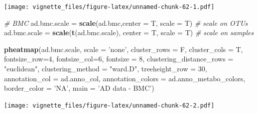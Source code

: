 \documentclass[]{book}
\newenvironment{Shaded}{\begin{snugshade}}{\end{snugshade}}
\newcommand{\KeywordTok}[1]{\textcolor[rgb]{0.13,0.29,0.53}{\textbf{#1}}}
\newcommand{\DataTypeTok}[1]{\textcolor[rgb]{0.13,0.29,0.53}{#1}}
\newcommand{\DecValTok}[1]{\textcolor[rgb]{0.00,0.00,0.81}{#1}}
\newcommand{\StringTok}[1]{\textcolor[rgb]{0.31,0.60,0.02}{#1}}
\newcommand{\CommentTok}[1]{\textcolor[rgb]{0.56,0.35,0.01}{\textit{#1}}}
\newcommand{\NormalTok}[1]{#1}
\begin{document}
\texttt{[image: vignette\_files/figure-latex/unnamed-chunk-62-1.pdf]}

\begin{Shaded}
\begin{Highlighting}[]
\CommentTok{# BMC}
\NormalTok{ad.bmc.scale =}\StringTok{ }\KeywordTok{scale}\NormalTok{(ad.bmc,}\DataTypeTok{center =}\NormalTok{ T, }\DataTypeTok{scale =}\NormalTok{ T) }\CommentTok{# scale on OTUs}
\NormalTok{ad.bmc.scale =}\StringTok{ }\KeywordTok{scale}\NormalTok{(}\KeywordTok{t}\NormalTok{(ad.bmc.scale), }\DataTypeTok{center =}\NormalTok{ T, }\DataTypeTok{scale =}\NormalTok{ T) }\CommentTok{# scale on samples}

\KeywordTok{pheatmap}\NormalTok{(ad.bmc.scale, }
         \DataTypeTok{scale =} \StringTok{'none'}\NormalTok{, }
         \DataTypeTok{cluster_rows =}\NormalTok{ F, }
         \DataTypeTok{cluster_cols =}\NormalTok{ T, }
         \DataTypeTok{fontsize_row=}\DecValTok{4}\NormalTok{, }\DataTypeTok{fontsize_col=}\DecValTok{6}\NormalTok{,}
         \DataTypeTok{fontsize =} \DecValTok{8}\NormalTok{,}
         \DataTypeTok{clustering_distance_rows =} \StringTok{"euclidean"}\NormalTok{,}
         \DataTypeTok{clustering_method =} \StringTok{"ward.D"}\NormalTok{,}
         \DataTypeTok{treeheight_row =} \DecValTok{30}\NormalTok{,}
         \DataTypeTok{annotation_col =}\NormalTok{ ad.anno_col,}
         \DataTypeTok{annotation_colors =}\NormalTok{ ad.anno_metabo_colors,}
         \DataTypeTok{border_color =} \StringTok{'NA'}\NormalTok{,}
         \DataTypeTok{main =} \StringTok{'AD data - BMC'}\NormalTok{)}
\end{Highlighting}
\end{Shaded}

\texttt{[image: vignette\_files/figure-latex/unnamed-chunk-62-2.pdf]}
\end{document}
